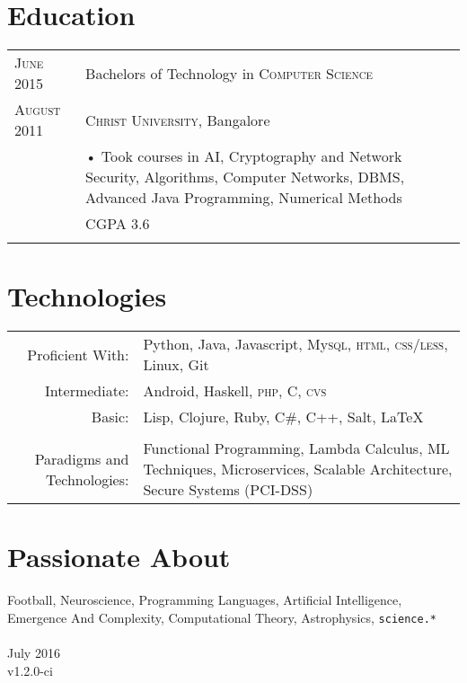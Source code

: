 \documentclass[a4paper,11pt]{article}
\begin{document}
%
\section{Education}
\begin{tabular}{ p{2.5cm} | p{12cm} }	
 \textsc{June} 2015 & Bachelors of Technology in \textsc{Computer Science} \\ 
 \textsc{August} 2011 & \textsc{Christ University}, Bangalore\\
 & \footnotesize{• Took courses in AI, Cryptography and Network Security, Algorithms, Computer Networks, DBMS, Advanced Java Programming, Numerical Methods} \\
 & \footnotesize{CGPA 3.6} \\
 \multicolumn{2}{c}{} \\
\end{tabular}

\section{Technologies}
\begin{tabular}{rp{10cm}}
 Proficient With:& Python, Java, Javascript, My\textsc{sql}, \textsc{html}, \textsc{css/less}, Linux, Git\\
Intermediate:& Android, Haskell, \textsc{php}, \textsc{C}, \textsc{cvs}\\
Basic: & Lisp, Clojure, Ruby, \textsc{C\#}, \textsc{C++}, Salt,     {\LaTeX}\\
\\
Paradigms and Technologies: & Functional Programming, Lambda Calculus, ML Techniques, Microservices, Scalable Architecture, Secure Systems (PCI-DSS)
\end{tabular}

\section{Passionate About}
Football, Neuroscience, Programming Languages, Artificial Intelligence, Emergence And Complexity, Computational Theory, Astrophysics, \texttt{science.*} \\

\\[15pt]
\footnotesize{July 2016} \\
\footnotesize{v1.2.0-ci}
\end{document}
